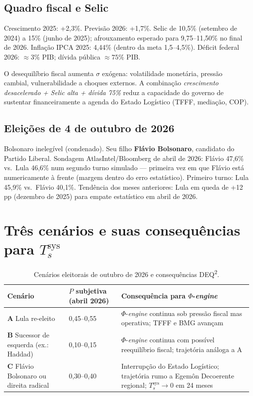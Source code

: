 \documentclass[12pt]{article}
\theoremstyle{definition}
\theoremstyle{remark}
\begin{document}
\subsection{Quadro fiscal e Selic}

Crescimento 2025: +2,3\%. Previs\~{a}o 2026: +1,7\%. Selic de 10,5\% (setembro de 2024) a 15\% (junho de 2025); afrouxamento esperado para 9,75--11,50\% no final de 2026. Inflação IPCA 2025: 4,44\% (dentro da meta 1,5--4,5\%). D\'{e}ficit federal 2026: \(\approx 3\%\) PIB; d\'{i}vida p\'{u}blica \(\approx 75\%\) PIB.

O desequil\'{i}brio fiscal aumenta \(\sigma\) ex\'{o}gena: volatilidade monet\'{a}ria, press\~{a}o cambial, vulnerabilidade a choques externos. A combina\c{c}\~{a}o \textit{crescimento desacelerado + Selic alta + d\'{i}vida 75\%} reduz a capacidade do governo de sustentar financeiramente a agenda do Estado Log\'{i}stico (TFFF, media\c{c}\~{a}o, COP).

\subsection{Elei\c{c}\~{o}es de 4 de outubro de 2026}

Bolsonaro inelegível (condenado). Seu filho \textbf{Fl\'{a}vio Bolsonaro}, candidato do Partido Liberal. Sondagem AtlasIntel/Bloomberg de abril de 2026: Fl\'{a}vio 47,6\% vs.\ Lula 46,6\% num segundo turno simulado --- primeira vez em que Fl\'{a}vio est\'{a} numericamente \`{a} frente (margem dentro do erro estat\'{i}stico). Primeiro turno: Lula 45,9\% vs.\ Fl\'{a}vio 40,1\%. Tend\^{e}ncia dos meses anteriores: Lula em queda de +12 pp (dezembro de 2025) para empate estat\'{i}stico em abril de 2026.

\section{Tr\^{e}s cen\'{a}rios e suas consequ\^{e}ncias para \(T_s^{\text{sys}}\)}

\begin{table}[h]
\centering
\caption{Cen\'{a}rios eleitorais de outubro de 2026 e consequ\^{e}ncias DEQ\textsuperscript{2}.}
\label{tab:cenarios}
{\small\begin{tabular}{p{3.2cm}p{2.8cm}p{5.5cm}}
\toprule
Cen\'{a}rio & \(P\) subjetiva (abril 2026) & Consequ\^{e}ncia para \(\Phi\)-\textit{engine} \\
\midrule
\textbf{A} Lula re-eleito & 0,45--0,55 & \(\Phi\)-\textit{engine} continua sob press\~{a}o fiscal mas operativa; TFFF e BMG avan\c{c}am \\
\textbf{B} Sucessor de esquerda (ex.: Haddad) & 0,10--0,15 & \(\Phi\)-\textit{engine} continua com poss\'{i}vel reequil\'{i}brio fiscal; trajet\'{o}ria análoga a A \\
\textbf{C} Fl\'{a}vio Bolsonaro ou direita radical & 0,30--0,40 & Interrup\c{c}\~{a}o do Estado Log\'{i}stico; trajet\'{o}ria rumo a Egem\^{o}n Decoerente regional; \(T_s^{\text{sys}} \to 0\) em 24 meses \\
\bottomrule
\end{tabular}}
\end{table}
\end{document}
